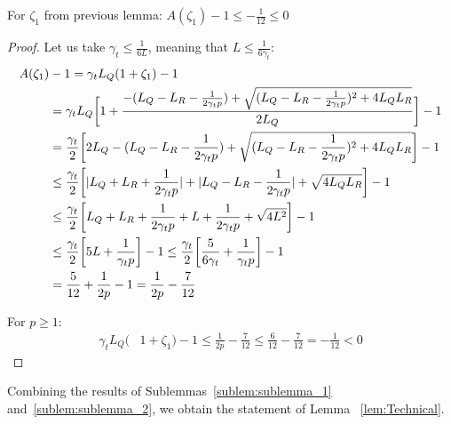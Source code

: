 \begin{sublemma}\label{sublem:sublemma_2}
    For $\zeta_1$ from previous lemma: $A(\zeta_1) - 1 \leq -\frac{1}{12} \leq 0$
\end{sublemma}
\begin{proof}
    Let us take $\gamma_{t} \leq \frac{1}{6 L}$, meaning that $L \leq \frac{1}{6 \gamma_{t} }$:
    \begin{align}
        A(\zeta_1)& - 1 = \gamma_{t} L_Q(1+\zeta_1) - 1 \\
        &= \gamma_{t} L_Q 
        \biggr[ 1 + \frac{-(L_Q - L_R - \frac{1}{2\gamma_{t} p})+\sqrt{(L_Q - L_R -\frac{1}{2\gamma_{t} p})^2 + 4 L_Q L_R}}{2L_Q}  \biggr] - 1\\
        &=
        \frac{\gamma_{t}}{2} 
        \biggr[ 2L_Q - (L_Q - L_R - \frac{1}{2\gamma_{t} p}) + \sqrt{(L_Q - L_R - \frac{1}{2\gamma_{t} p})^2 + 4 L_Q L_R}  \biggr] - 1\\ 
        & \leq
        \frac{\gamma_{t}}{2} 
        \biggr[ |L_Q + L_R + \frac{1}{2\gamma_{t} p}| + |L_Q - L_R - \frac{1}{2\gamma_{t} p}| + \sqrt{ 4 L_Q L_R}  \biggr] - 1\\
        & \leq
        \frac{\gamma_{t}}{2} 
        \biggr[ L_Q + L_R + \frac{1}{2\gamma_{t} p} + L + \frac{1}{2\gamma_{t} p} + \sqrt{ 4 L^2}  \biggr] - 1\\
        & \leq
        \frac{\gamma_{t}}{2} 
        \biggr[ 5 L + \frac{1}{\gamma_{t} p}  \biggr] - 1
        \leq
        \frac{\gamma_{t}}{2} 
        \biggr[ \frac{5}{6 \gamma_{t}} + \frac{1}{\gamma_{t} p}  \biggr] - 1 \\
        &=
        \frac{5}{12} + \frac{1}{2p} - 1
        = \frac{1}{2p} - \frac{7}{12}
    \end{align}
    
    For $p \geq 1$:
    \begin{align}
         \gamma_{t} L_Q(&1+\zeta_1) - 1 \leq \frac{1}{2p} - \frac{7}{12} \leq \frac{6}{12} - \frac{7}{12} 
         = -\frac{1}{12} < 0 \label{eq:St_6}
    \end{align}
\end{proof}

Combining the results of Sublemmas~\ref{sublem:sublemma_1} and~\ref{sublem:sublemma_2}, 
we obtain the statement of Lemma ~\ref{lem:Technical}.

